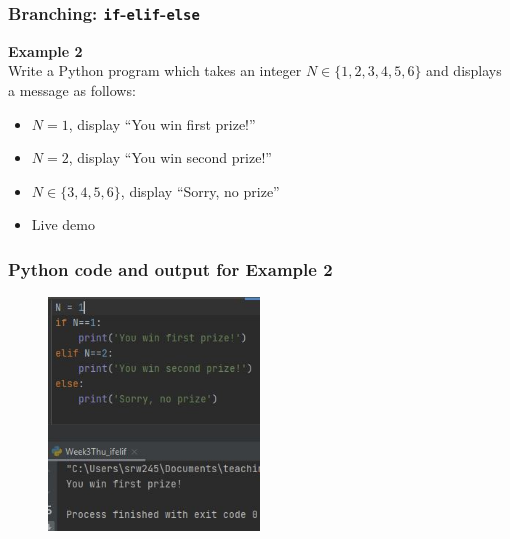 \documentclass[english,14pt]{beamer}
\begin{document}

\begin{frame}[fragile]

\frametitle{Branching: \texttt{if}-\texttt{elif}-\texttt{else}}

\textbf{Example 2}\\
\vspace*{5mm}
Write a Python program which takes an integer $N \in \{1,2,3,4,5,6\}$ and displays a message as follows:

\begin{itemize}
\item $N=1$, display ``You win first prize!''
\item $N=2$, display ``You win second prize!''
\item $N \in \{3,4,5,6\}$, display ``Sorry, no prize''
\end{itemize}

\vspace*{5mm}

\begin{itemize}
	\item Live demo
\end{itemize}
	
\end{frame}


\begin{frame}[fragile]

\frametitle{Python code and output for Example 2}

\begin{figure}[ht]
	\centering
	\includegraphics[width=0.5\textwidth]{figures/Week3ThuEx2a}
\end{figure}

\end{frame}
\end{document}
